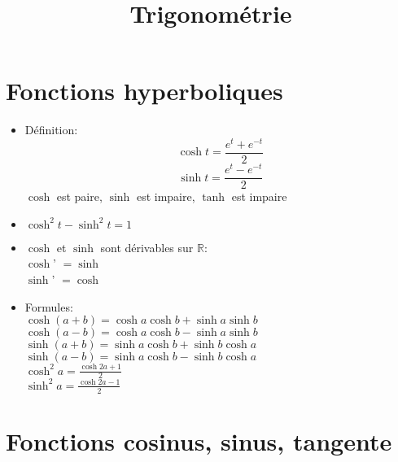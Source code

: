 \documentclass[fleqn]{article}
\title{Trigonom\'etrie}
\date{}
\begin{document}
\maketitle

\section{Fonctions hyperboliques}
\begin{itemize}
	\item D\'{e}finition:
		\[ \cosh t = \frac{e^t + e^{-t}}{2} \]
		\[ \sinh t = \frac{e^t - e^{-t}}{2} \]
		$\cosh$ est paire, $\sinh$ est impaire, $\tanh$ est impaire
	\item $ \cosh^2 t - \sinh^2 t = 1 $
	\item $\cosh$ et $\sinh$ sont d\'{e}rivables sur $\mathbb{R}$: \\
		$\cosh$' $ = \sinh$ \\
		$\sinh$' $ = \cosh$
	\newline
	\item Formules: \\
		$\cosh (a+b) = \cosh a\cosh b + \sinh a\sinh b$ \\
		$\cosh (a-b) = \cosh a\cosh b - \sinh a\sinh b$ \\
		$\sinh (a+b) = \sinh a\cosh b + \sinh b\cosh a$ \\
		$\sinh (a-b) = \sinh a\cosh b - \sinh b\cosh a$ \\
		$\cosh^2 a = \frac{\cosh 2a + 1}{2}$ \\
		$\sinh^2 a = \frac{\cosh 2a - 1}{2}$
\end{itemize}

\section{Fonctions cosinus, sinus, tangente}
\end{document}
